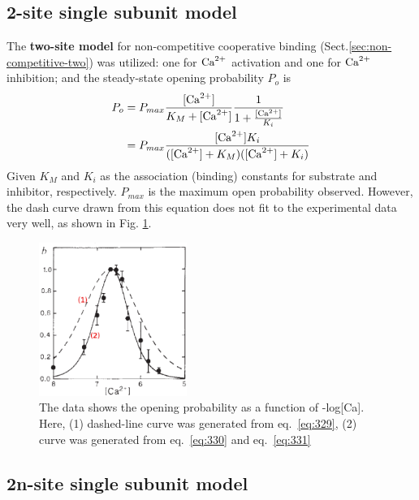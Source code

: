 \subsection{2-site single subunit model}

The {\bf two-site model} for non-competitive cooperative binding
(Sect.\ref{sec:non-competitive-two}) was utilized:
one for ${\text{Ca}^{2+}}$ activation and one for ${\text{Ca}^{2+}}$ inhibition; and the steady-state
opening probability $P_o$ is
\begin{equation}
  \label{eq:329}
  \begin{split}
      P_o &= P_{max} \frac{[\ce{Ca^2+}]}{K_M + [\ce{Ca^2+}]}
      \frac{1}{1+\frac{[\ce{Ca^2+}]}{K_i}} \\
      &= P_{max} \frac{[\ce{Ca^2+}]K_i}{([\ce{Ca^2+}]+K_M)([\ce{Ca^2+}]+K_i)}
  \end{split}
\end{equation}
Given $K_M$ and $K_i$ as
the association (binding) constants for substrate and inhibitor, respectively.
 $P_{max}$ is the maximum open probability observed. However, the
dash curve drawn from this equation does not fit to the experimental
data very well, as shown in Fig. \ref{fig:bezprozvanny1991}.


\begin{figure}[hbt]
  \centerline{\includegraphics[height=5cm]{./images/bezprozvanny1991_bellshape.eps}}
  \caption{
  The data shows the opening probability as a function of -log[Ca]. Here, 
  (1) dashed-line curve was generated from
    eq.~\eqref{eq:329}, (2) curve was generated from
    eq.~\eqref{eq:330} and eq.~\eqref{eq:331}}
\label{fig:bezprozvanny1991}
\end{figure}

\subsection{2n-site single subunit model}

